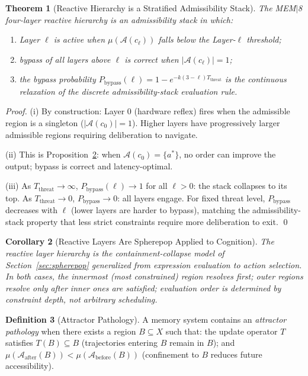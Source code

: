 \documentclass[12pt, a4paper, twoside]{article}
\theoremstyle{plain}
\newtheorem{theorem}{Theorem}[section]
\newtheorem{corollary}[theorem]{Corollary}
\theoremstyle{definition}
\newtheorem{definition}[theorem]{Definition}
\theoremstyle{remark}
\newcommand{\Acc}{\mathcal{A}}
\begin{document}
\begin{theorem}[Reactive Hierarchy is a Stratified Admissibility Stack]
\label{thm:reactive_stack}
The MEM$|$8 four-layer reactive hierarchy is an admissibility stack in which:
\begin{enumerate}[label=(\roman*)]
  \item Layer $\ell$ is active when $\mu(\Acc(c_\ell))$ falls below the
    Layer-$\ell$ threshold;
  \item bypass of all layers above $\ell$ is correct when $|\Acc(c_\ell)|=1$;
  \item the bypass probability $P_{\mathrm{bypass}}(\ell) = 1 -
    e^{-k(3-\ell)T_{\mathrm{threat}}}$ is the continuous relaxation of the
    discrete admissibility-stack evaluation rule.
\end{enumerate}
\end{theorem}

\begin{proof}
(i) By construction: Layer 0 (hardware reflex) fires when the admissible
region is a singleton ($|\Acc(c_0)|=1$). Higher layers have progressively
larger admissible regions requiring deliberation to navigate.

(ii) This is Proposition~\ref{prop:reactive_spherepop}: when $\Acc(c_0)=\{a^*\}$,
no order can improve the output; bypass is correct and latency-optimal.

(iii) As $T_{\mathrm{threat}} \to \infty$, $P_{\mathrm{bypass}}(\ell) \to 1$
for all $\ell>0$: the stack collapses to its top. As $T_{\mathrm{threat}} \to 0$,
$P_{\mathrm{bypass}} \to 0$: all layers engage. For fixed threat level,
$P_{\mathrm{bypass}}$ decreases with $\ell$ (lower layers are harder to bypass),
matching the admissibility-stack property that less strict constraints require
more deliberation to exit. \qed
\end{proof}

\begin{corollary}[Reactive Layers Are Spherepop Applied to Cognition]
\label{prop:reactive_spherepop}
The reactive layer hierarchy is the containment-collapse model of
Section~\ref{sec:spherepop} generalized from expression evaluation to action
selection. In both cases, the innermost (most constrained) region resolves
first; outer regions resolve only after inner ones are satisfied; evaluation
order is determined by constraint depth, not arbitrary scheduling.
\end{corollary}


\begin{definition}[Attractor Pathology]
\label{def:attractor_pathology}
A memory system contains an \emph{attractor pathology} when there exists a
region $B \subseteq X$ such that: the update operator $T$ satisfies
$T(B) \subseteq B$ (trajectories entering $B$ remain in $B$); and
$\mu(\Acc_{\mathrm{after}}(B)) < \mu(\Acc_{\mathrm{before}}(B))$ (confinement
to $B$ reduces future accessibility).
\end{definition}
\end{document}
